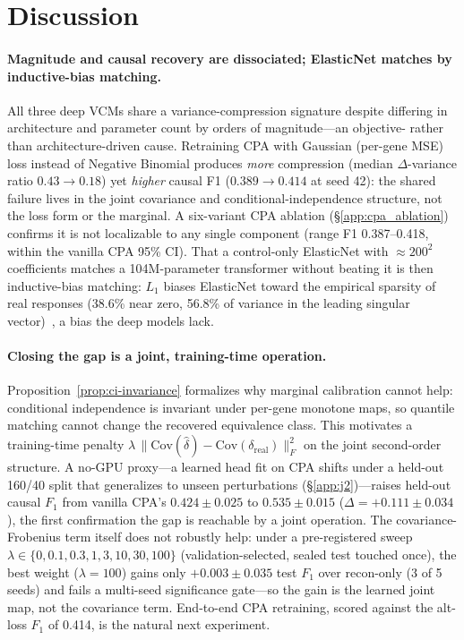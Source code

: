 \documentclass{article}
\theoremstyle{plain}
\theoremstyle{definition}
\theoremstyle{remark}
\begin{document}
\section{Discussion}
\label{sec:discussion}

\paragraph{Magnitude and causal recovery are dissociated; ElasticNet matches by inductive-bias matching.}
All three deep VCMs share a variance-compression signature despite differing in architecture and parameter count by orders of magnitude---an objective- rather than architecture-driven cause. Retraining CPA with Gaussian (per-gene MSE) loss instead of Negative Binomial produces \emph{more} compression (median $\Delta$-variance ratio $0.43 \to 0.18$) yet \emph{higher} causal F1 ($0.389 \to 0.414$ at seed 42): the shared failure lives in the joint covariance and conditional-independence structure, not the loss form or the marginal. A six-variant CPA ablation (\S\ref{app:cpa_ablation}) confirms it is not localizable to any single component (range F1 0.387--0.418, within the vanilla CPA 95\% CI). That a control-only ElasticNet with $\approx\!200^2$ coefficients matches a 104M-parameter transformer without beating it is then inductive-bias matching: $L_1$ biases ElasticNet toward the empirical sparsity of real responses (38.6\% near zero, 56.8\% of variance in the leading singular vector)~\citep{zou2005elasticnet}, a bias the deep models lack.

\paragraph{Closing the gap is a joint, training-time operation.}
Proposition~\ref{prop:ci-invariance} formalizes why marginal calibration cannot help: conditional independence is invariant under per-gene monotone maps, so quantile matching cannot change the recovered equivalence class. This motivates a training-time penalty $\lambda\,\lVert \mathrm{Cov}(\hat\delta) - \mathrm{Cov}(\delta_{\text{real}})\rVert_F^2$ on the joint second-order structure. A no-GPU proxy---a learned head fit on CPA shifts under a held-out 160/40 split that generalizes to unseen perturbations (\S\ref{app:j2})---raises held-out causal $F_1$ from vanilla CPA's $0.424 \pm 0.025$ to $0.535 \pm 0.015$ ($\Delta = +0.111 \pm 0.034$), the first confirmation the gap is reachable by a joint operation. The covariance-Frobenius term itself does not robustly help: under a pre-registered sweep $\lambda\in\{0,0.1,0.3,1,3,10,30,100\}$ (validation-selected, sealed test touched once), the best weight ($\lambda{=}100$) gains only $+0.003 \pm 0.035$ test $F_1$ over recon-only (3 of 5 seeds) and fails a multi-seed significance gate---so the gain is the learned joint map, not the covariance term. End-to-end CPA retraining, scored against the alt-loss $F_1$ of 0.414, is the natural next experiment.
\end{document}
